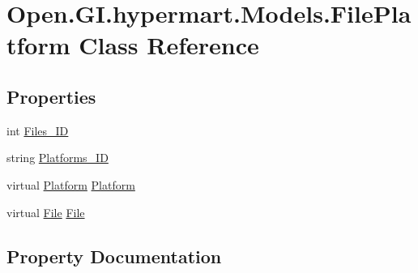 \hypertarget{class_open_1_1_g_i_1_1hypermart_1_1_models_1_1_file_platform}{}\section{Open.\+G\+I.\+hypermart.\+Models.\+File\+Platform Class Reference}
\label{class_open_1_1_g_i_1_1hypermart_1_1_models_1_1_file_platform}
\subsection*{Properties}
\begin{DoxyCompactItemize}
\item 
int \hyperlink{class_open_1_1_g_i_1_1hypermart_1_1_models_1_1_file_platform_a6a2b6dbace772016d649b3feb7c65e44}{Files\+\_\+\+ID}
\item 
string \hyperlink{class_open_1_1_g_i_1_1hypermart_1_1_models_1_1_file_platform_afe9e1d6e156cababf5d2123d21556d5f}{Platforms\+\_\+\+ID}
\item 
virtual \hyperlink{class_open_1_1_g_i_1_1hypermart_1_1_models_1_1_platform}{Platform} \hyperlink{class_open_1_1_g_i_1_1hypermart_1_1_models_1_1_file_platform_aeab28cbe72f89ee18f61510d8ea2b7bc}{Platform}
\item 
virtual \hyperlink{class_open_1_1_g_i_1_1hypermart_1_1_models_1_1_file}{File} \hyperlink{class_open_1_1_g_i_1_1hypermart_1_1_models_1_1_file_platform_aa9fd91411ba71f8dd77bdba062daecd3}{File}
\end{DoxyCompactItemize}


\subsection{Property Documentation}
\hypertarget{class_open_1_1_g_i_1_1hypermart_1_1_models_1_1_file_platform_aa9fd91411ba71f8dd77bdba062daecd3}{}\label{class_open_1_1_g_i_1_1hypermart_1_1_models_1_1_file_platform_aa9fd91411ba71f8dd77bdba062daecd3} 
